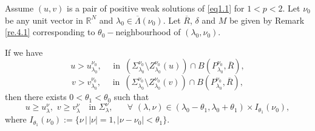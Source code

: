 \documentclass[10pt,a4paper]{amsart}
\newcommand{\R}{\mathbb{R}}
\begin{document}
\begin{lem}\label{lm.4.2}
Assume $(u,v)$ is a pair of positive weak solutions of \eqref{eq1.1} for $1<p<2$. Let $\nu_0$ be any unit vector in $\R^N$ and $\lambda_0\in\overline{\Lambda}(\nu_0)$. Let $\overline{R}$, $\delta$ and $M$ be given by Remark \ref{re.4.1} corresponding to $\theta_0-$neighbourhood of $(\lambda_0,\nu_0)$.

If we have
\begin{equation}\label{assump}
  u>u_{\lambda_0}^{\nu_0},\quad\,\,\mbox{in} \,\,\,(\Sigma_{\lambda_0}^{\nu_0}\setminus Z_{\lambda_0}^{\nu_0}(u))  \cap  B(P_{\lambda_0}^{\nu_0},\overline{R}),
\end{equation}
\begin{equation}\label{assump-}
  v>v_{\lambda_0}^{\nu_0},\quad\,\,\mbox{in} \,\,\,(\Sigma_{\lambda_0}^{\nu_0}\setminus Z_{\lambda_0}^{\nu_0}(v))  \cap  B(P_{\lambda_0}^{\nu_0},\overline{R}),
\end{equation}
then there exists $0<\theta_1 < \theta_0$ such that
$$ u\geq u^{\nu}_{\lambda},\,\,v\geq v^{\nu}_{\lambda} \quad \mbox{in}\,\, \Sigma_\lambda^\nu,\,\,\,\,\quad \forall\,\,(\lambda,\nu)\in (\lambda_0-\theta_1,\lambda_0+\theta_1)\times I_{\theta_1}(\nu_0),$$
where $I_{\theta_1}(\nu_0):=\{ \nu \,|\, |\nu|=1, |\nu-\nu_0|<\theta_1 \}$.
\end{lem}
\end{document}
